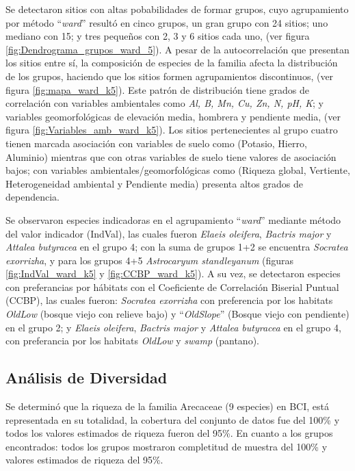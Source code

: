 \documentclass[11pt,]{article}
\begin{document}
Se detectaron sitios con altas pobabilidades de formar grupos, cuyo
agrupamiento por método ``\emph{ward}'' resultó en cinco grupos, un gran
grupo con 24 sitios; uno mediano con 15; y tres pequeños con 2, 3 y 6
sitios cada uno, (ver figura \ref{fig:Dendrograma_grupos_ward_5}). A
pesar de la autocorrelación que presentan los sitios entre sí, la
composición de especies de la familia afecta la distribución de los
grupos, haciendo que los sitios formen agrupamientos discontinuos, (ver
figura \ref{fig:mapa_ward_k5}). Este patrón de distribución tiene grados
de correlación con variables ambientales como \emph{Al, B, Mn, Cu, Zn,
N, pH, K}; y variables geomorfológicas de elevación media, hombrera y
pendiente media, (ver figura \ref{fig:Variables_amb_ward_k5}). Los
sitios pertenecientes al grupo cuatro tienen marcada asociación con
variables de suelo como (Potasio, Hierro, Aluminio) mientras que con
otras variables de suelo tiene valores de asociación bajos; con
variables ambientales/geomorfológicas como (Riqueza global, Vertiente,
Heterogeneidad ambiental y Pendiente media) presenta altos grados de
dependencia.

Se observaron especies indicadoras en el agrupamiento ``\emph{ward}''
mediante método del valor indicador (IndVal), las cuales fueron
\emph{Elaeis oleifera}, \emph{Bactris major} y \emph{Attalea butyracea}
en el grupo 4; con la suma de grupos 1+2 se encuentra \emph{Socratea
exorrizha}, y para los grupos 4+5 \emph{Astrocaryum standleyanum}
(figuras \ref{fig:IndVal_ward_k5} y \ref{fig:CCBP_ward_k5}). A su vez,
se detectaron especies con preferancias por hábitats con el Coeficiente
de Correlación Biserial Puntual (CCBP), las cuales fueron:
\emph{Socratea exorrizha} con preferencia por los habitats \emph{OldLow}
(bosque viejo con relieve bajo) y ``\emph{OldSlope}'' (Bosque viejo con
pendiente) en el grupo 2; y \emph{Elaeis oleifera}, \emph{Bactris major}
y \emph{Attalea butyracea} en el grupo 4, con preferancia por los
habitats \emph{OldLow} y \emph{swamp} (pantano).

\subsection{Análisis de Diversidad}\label{anuxe1lisis-de-diversidad}

Se determinó que la riqueza de la familia Arecaceae (9 especies) en BCI,
está representada en su totalidad, la cobertura del conjunto de datos
fue del 100\% y todos los valores estimados de riqueza fueron del 95\%.
En cuanto a los grupos encontrados: todos los grupos mostraron
completitud de muestra del 100\% y valores estimados de riqueza del
95\%.
\end{document}
